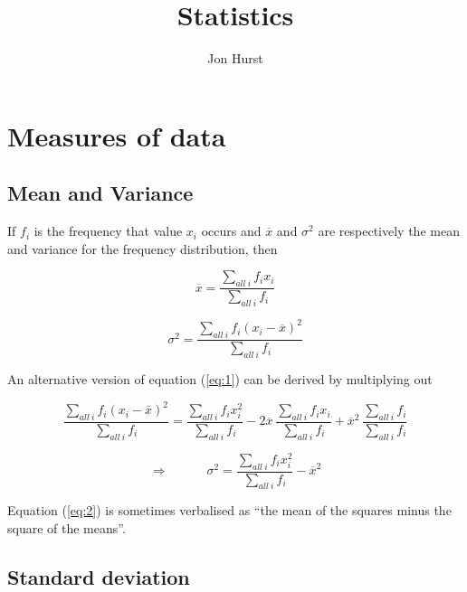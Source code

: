 \documentclass[a5paper]{article}
\title{Statistics}
\author{Jon Hurst}
\begin{document}
\maketitle

\section{Measures of data}
\subsection{Mean and Variance}

If $f_i$ is the frequency that value $x_i$ occurs and $\overline{x}$ and
$\sigma^2$ are respectively the mean and variance for the frequency
distribution, then

\begin{equation}
  \overline{x} = \frac{\sum\limits_{all\ i} f_i x_i}{\sum\limits_{all\ i} f_i}
\end{equation}

\begin{equation} \label{eq:1}
  \sigma^2 = \frac{\sum\limits_{all\ i} f_i (x_i - \overline{x})^2}{\sum\limits_{all\ i} f_i}
\end{equation}

\noindent An alternative version of equation (\ref{eq:1}) can be derived by
multiplying out

\begin{equation}
  \frac{\sum\limits_{all\ i} f_i (x_i - \overline{x})^2}{\sum\limits_{all\ i} f_i} =
  \frac{\sum\limits_{all\ i} f_i x_i^2}{\sum\limits_{all\ i} f_i}
  -2\overline{x}\ \frac{\sum\limits_{all\ i} f_i x_i}{\sum\limits_{all\ i} f_i}
  + \overline{x}^2\ \frac{\sum\limits_{all\ i} f_i}{\sum\limits_{all\ i} f_i}
\end{equation}

\begin{equation} \label{eq:2}
  \Rightarrow\hspace{3em} \sigma^2 = \frac{\sum\limits_{all\ i} f_i x_i^2}{\sum\limits_{all\ i} f_i} -
  \overline{x}^2
\end{equation}

\noindent Equation (\ref{eq:2}) is sometimes verbalised as ``the mean of the squares
minus the square of the means''.

\subsection{Standard deviation}
\end{document}
